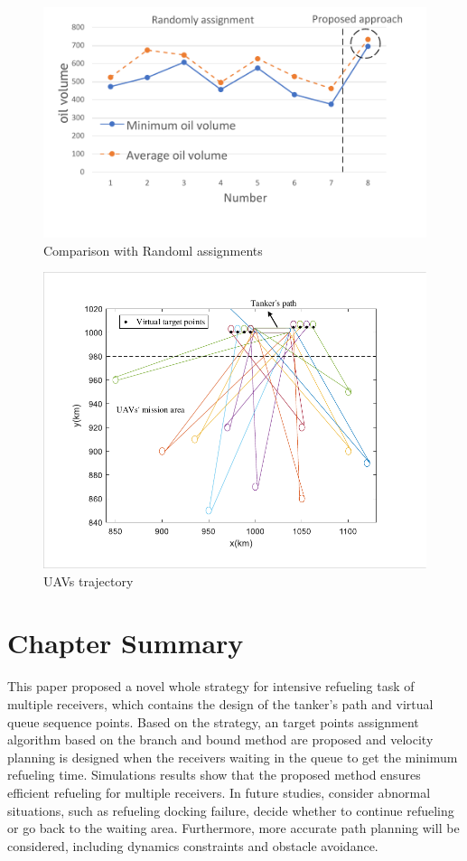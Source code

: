 \begin{figure}[htbp]
	\centerline{\includegraphics[width=.5\textwidth]{Figures/Figs_Ch15/fig10.pdf}}
	\caption{Comparison with Randoml assignments}
	\label{fig}
\end{figure}
\begin{figure}[htbp]
	\centerline{\includegraphics[width=.5\textwidth]{Figures/Figs_Ch15/fig9.pdf}}
	\caption{UAVs trajectory}
	\label{fig}
\end{figure}


\section{Chapter Summary}
This paper proposed a novel whole  strategy for intensive refueling task of multiple receivers, which contains the design of the tanker's path and virtual queue sequence points. Based on the strategy, an target points assignment algorithm based on the branch and bound method are proposed and velocity planning is designed when the receivers waiting in the queue to get the minimum refueling time.
Simulations results show that the proposed method ensures efficient refueling for multiple receivers. In future studies, consider abnormal situations, such as refueling docking failure, decide whether to continue refueling or go back to the waiting area. Furthermore, more accurate path planning will be considered, including dynamics constraints and obstacle avoidance.